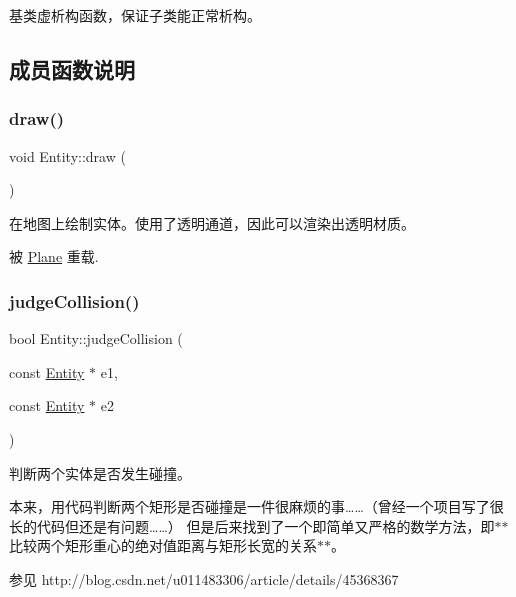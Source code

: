 基类虚析构函数，保证子类能正常析构。 



\subsection{成员函数说明}
\mbox{\label{class_entity_a7666f416dd0d1fce0f1133f78df44476}} 
\subsubsection{\texorpdfstring{draw()}{draw()}}
{\footnotesize\ttfamily void Entity\+::draw (\begin{DoxyParamCaption}{ }\end{DoxyParamCaption})\hspace{0.3cm}{\ttfamily [virtual]}}



在地图上绘制实体。使用了透明通道，因此可以渲染出透明材质。 



被 \hyperlink{class_plane_a8877358878e91929c4c01bad40cbdb78}{Plane} 重载.

\mbox{\label{class_entity_afeab7f54f15446e13fbf218eccb8be53}} 
\subsubsection{\texorpdfstring{judge\+Collision()}{judgeCollision()}}
{\footnotesize\ttfamily bool Entity\+::judge\+Collision (\begin{DoxyParamCaption}\item[{const \hyperlink{class_entity}{Entity} $\ast$}]{e1,  }\item[{const \hyperlink{class_entity}{Entity} $\ast$}]{e2 }\end{DoxyParamCaption})\hspace{0.3cm}{\ttfamily [static]}}



判断两个实体是否发生碰撞。 

本来，用代码判断两个矩形是否碰撞是一件很麻烦的事……（曾经一个项目写了很长的代码但还是有问题……） 但是后来找到了一个即简单又严格的数学方法，即$\ast$$\ast$比较两个矩形重心的绝对值距离与矩形长宽的关系$\ast$$\ast$。 \begin{DoxySeeAlso}{参见}
http\+://blog.\+csdn.\+net/u011483306/article/details/45368367


\end{DoxySeeAlso}



